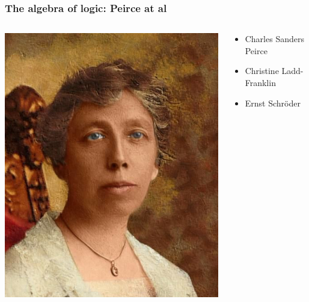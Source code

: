 \begin{frame}
  \frametitle{The algebra of logic: Peirce at al}

  \begin{columns}
    \begin{column}{.5\textwidth}
      \includegraphics[width=\textwidth]{../assets/ladd-franklin}
    \end{column}
    \begin{column}{.5\textwidth}
      \begin{itemize}
        \item Charles Sanders Peirce
        \item Christine Ladd-Franklin
        \item Ernst Schr\"oder
      \end{itemize}
    \end{column}
  \end{columns}
\end{frame}

